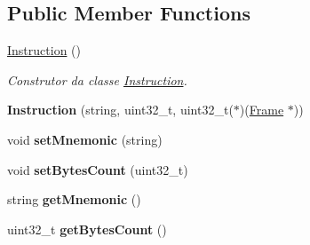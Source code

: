 \subsection*{Public Member Functions}
\begin{DoxyCompactItemize}
\item 
\hyperlink{classInstruction_aebd15229c1651af49dcb203707e7a2d5}{Instruction} ()
\begin{DoxyCompactList}\small\item\em Construtor da classe \hyperlink{classInstruction}{Instruction}. \end{DoxyCompactList}\item 
{\bfseries Instruction} (string, uint32\+\_\+t, uint32\+\_\+t($\ast$)(\hyperlink{classFrame}{Frame} $\ast$))\hypertarget{classInstruction_a796b0697656d6d1230d94f942680245b}{}\label{classInstruction_a796b0697656d6d1230d94f942680245b}

\item 
void {\bfseries set\+Mnemonic} (string)\hypertarget{classInstruction_a507efd4e2f184c09f4349b682479bfb5}{}\label{classInstruction_a507efd4e2f184c09f4349b682479bfb5}

\item 
void {\bfseries set\+Bytes\+Count} (uint32\+\_\+t)\hypertarget{classInstruction_a963419f34dc60eba3f5e5d8aa86da6f2}{}\label{classInstruction_a963419f34dc60eba3f5e5d8aa86da6f2}

\item 
string {\bfseries get\+Mnemonic} ()\hypertarget{classInstruction_a467cd8f7f8f8d22c9d3d26c9dbbb6b97}{}\label{classInstruction_a467cd8f7f8f8d22c9d3d26c9dbbb6b97}

\item 
uint32\+\_\+t {\bfseries get\+Bytes\+Count} ()\hypertarget{classInstruction_a0cc76fd49fa6bc6f7ec395484fa18cb3}{}\label{classInstruction_a0cc76fd49fa6bc6f7ec395484fa18cb3}

\end{DoxyCompactItemize}
